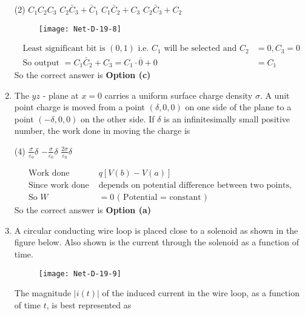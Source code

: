\begin{enumerate}
 \begin{tasks}(2)
	\task[\textbf{a.}]$C_{1} C_{2} C_{3}$
	\task[\textbf{b.}]$C_{2} \bar{C}_{3}+\bar{C}_{1}$
	\task[\textbf{c.}]$C_{1} \bar{C}_{2}+C_{3}$
	\task[\textbf{d.}] $C_{2} \bar{C}_{3}+C_{2}$	
\end{tasks}
\begin{figure}[H]
	\centering
	\texttt{[image: Net-D-19-8]}
\end{figure}
\begin{answer}
	\begin{align*}
	\text { Least significant bit is }(0,1) \text { i.e. } C_{1} \text { will be selected and } C_{2}&=0, C_{3}=0\\
	\text { So output }=C_{1} \bar{C}_{2}+C_{3}=C_{1} \cdot \overline{0}+0&=C_{1}
	\end{align*}
		So the correct answer is \textbf{Option (c)}
\end{answer}
\item The $y z$ - plane at $x=0$ carries a uniform surface charge density $\sigma$. A unit point charge is moved from a point $(\delta, 0,0)$ on one side of the plane to a point $(-\delta, 0,0)$ on the other side. If $\delta$ is an infinitesimally small positive number, the work done in moving the charge is
 \begin{tasks}(4)
	\task[\textbf{b.}]$\frac{\sigma}{\varepsilon_{0}} \delta$
	\task[\textbf{c.}]$-\frac{\sigma}{\varepsilon_{0}} \delta$
	\task[\textbf{d.}]$\frac{2 \sigma}{\varepsilon_{0}} \delta$ 
\end{tasks}
\begin{answer}
	\begin{align*}
	\text { Work done }& q[V(b)-V(a)]\\
	\text { Since work done }&\text{depends on potential difference between two points, }\\
\text{	So }W&=0
\text{	( Potential = constant )}
	\end{align*}
	So the correct answer is \textbf{Option (a)}
\end{answer}
\item A circular conducting wire loop is placed close to a solenoid as shown in the figure below. Also shown is the current through the solenoid as a function of time.	
\begin{figure}[H]
	\centering
	\texttt{[image: Net-D-19-9]}
\end{figure}
The magnitude $|i(t)|$ of the induced current in the wire loop, as a function of time $t$, is best represented as

\end{enumerate}
